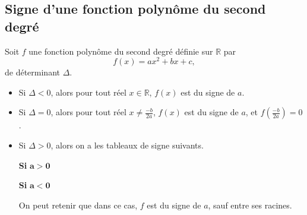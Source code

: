 \documentclass[11pt]{article}
\begin{document}
\subsection{Signe d'une fonction polynôme du second degré}
\begin{propadm}
  Soit $f$ une fonction polynôme du second degré définie sur $\mathbb{R}$ par
  \[
    f(x)=ax^2+bx+c,
  \]
  de déterminant $\Delta$.
  \begin{itemize}
    \item Si $\Delta<0$, alors pour tout réel $x\in\mathbb{R}$, $f(x)$ est du
      signe de $a$.
    \item Si $\Delta=0$, alors pour tout réel $x\neq\frac{-b}{2a}$, $f(x)$ est
      du signe de $a$, et $f(\frac{-b}{2a})=0$.
    \item Si $\Delta>0$, alors on a les tableaux de signe suivants.

      \noindent
  \begin{minipage}[t]{.47\textwidth}
    \begin{center}
      {\bf Si} $\mathbf{a>0}$\vspace{.2cm}

    \end{center}
  \vspace{.2cm}
  \end{minipage}
    \hfill
  \begin{minipage}[t]{.47\textwidth}
    \begin{center}
      {\bf Si} $\mathbf{a<0}$\vspace{.2cm}

    \end{center}
  \vspace{.2cm}
  \end{minipage}
  On peut retenir que dans ce cas, $f$ est du signe de $a$, sauf entre ses
  racines.
  \end{itemize}
\end{propadm}
\end{document}
